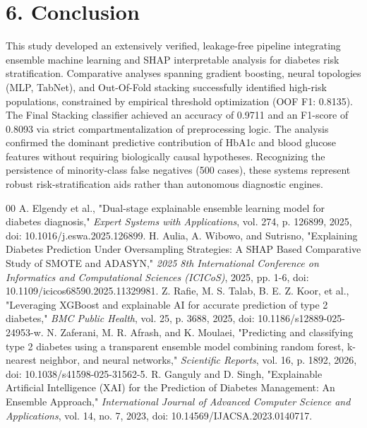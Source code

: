 \documentclass[conference]{IEEEtran}
\begin{document}
\section{6. Conclusion}
This study developed an extensively verified, leakage-free pipeline integrating ensemble machine learning and SHAP interpretable analysis for diabetes risk stratification. Comparative analyses spanning gradient boosting, neural topologies (MLP, TabNet), and Out-Of-Fold stacking successfully identified high-risk populations, constrained by empirical threshold optimization (OOF F1: 0.8135). The Final Stacking classifier achieved an accuracy of 0.9711 and an F1-score of 0.8093 via strict compartmentalization of preprocessing logic. The analysis confirmed the dominant predictive contribution of HbA1c and blood glucose features without requiring biologically causal hypotheses. Recognizing the persistence of minority-class false negatives (500 cases), these systems represent robust risk-stratification aids rather than autonomous diagnostic engines.

\begin{thebibliography}{00}
 A. Elgendy et al., "Dual-stage explainable ensemble learning model for diabetes diagnosis," \textit{Expert Systems with Applications}, vol. 274, p. 126899, 2025, doi: 10.1016/j.eswa.2025.126899.
 H. Aulia, A. Wibowo, and Sutrisno, "Explaining Diabetes Prediction Under Oversampling Strategies: A SHAP Based Comparative Study of SMOTE and ADASYN," \textit{2025 8th International Conference on Informatics and Computational Sciences (ICICoS)}, 2025, pp. 1-6, doi: 10.1109/icicos68590.2025.11329981.
 Z. Rafie, M. S. Talab, B. E. Z. Koor, et al., "Leveraging XGBoost and explainable AI for accurate prediction of type 2 diabetes," \textit{BMC Public Health}, vol. 25, p. 3688, 2025, doi: 10.1186/s12889-025-24953-w.
 N. Zaferani, M. R. Afrash, and K. Moulaei, "Predicting and classifying type 2 diabetes using a transparent ensemble model combining random forest, k-nearest neighbor, and neural networks," \textit{Scientific Reports}, vol. 16, p. 1892, 2026, doi: 10.1038/s41598-025-31562-5.
 R. Ganguly and D. Singh, "Explainable Artificial Intelligence (XAI) for the Prediction of Diabetes Management: An Ensemble Approach," \textit{International Journal of Advanced Computer Science and Applications}, vol. 14, no. 7, 2023, doi: 10.14569/IJACSA.2023.0140717.
\end{thebibliography}
\end{document}
